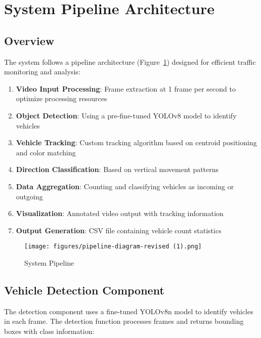 \documentclass[9pt,a4paper,twoside]{rho-class/rho}
\begin{document}
\section{System Pipeline Architecture}

    \subsection{Overview}
    
    The system follows a pipeline architecture (Figure~\ref{fig:system-pipeline}) designed for efficient traffic monitoring and analysis:
    
    \begin{enumerate}
        \item \textbf{Video Input Processing}: Frame extraction at 1 frame per second to optimize processing resources
        \item \textbf{Object Detection}: Using a pre-fine-tuned YOLOv8 model to identify vehicles
        \item \textbf{Vehicle Tracking}: Custom tracking algorithm based on centroid positioning and color matching
        \item \textbf{Direction Classification}: Based on vertical movement patterns
        \item \textbf{Data Aggregation}: Counting and classifying vehicles as incoming or outgoing
        \item \textbf{Visualization}: Annotated video output with tracking information
        \item \textbf{Output Generation}: CSV file containing vehicle count statistics
    \end{enumerate}

    \begin{figure}[h]
        \centering
        \texttt{[image: figures/pipeline-diagram-revised (1).png]}
        \caption{System Pipeline }
        \label{fig:system-pipeline}
    \end{figure}
    
    \subsection{Vehicle Detection Component}
    
    The detection component uses a fine-tuned YOLOv8n model to identify vehicles in each frame. The detection function processes frames and returns bounding boxes with class information:
    
\end{document}

